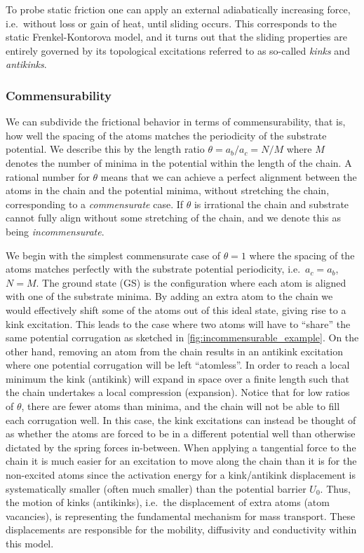 To probe static friction one can apply an external adiabatically increasing force, i.e.\ without loss or gain of heat, until sliding occurs. This corresponds to the static Frenkel-Kontorova model, and it turns out that the sliding properties are entirely governed by its topological excitations referred to as so-called \textit{kinks} and \textit{antikinks}.

\subsubsection{Commensurability} We can subdivide the frictional behavior in terms of commensurability, that is, how well the spacing of the atoms matches the periodicity of the substrate potential. We describe this by the length ratio $\theta = a_b / a_c = N / M$ where $M$ denotes the number of minima in the potential within the length of the chain. A rational number for $\theta$ means that we can achieve a perfect alignment between the atoms in the chain and the potential minima, without stretching the chain, corresponding to a \textit{commensurate} case. If $\theta$ is irrational the chain and substrate cannot fully align without some stretching of the chain, and we denote this as being \textit{incommensurate}.

We begin with the simplest commensurate case of $\theta = 1$ where the spacing
of the atoms matches perfectly with the substrate potential periodicity, i.e.\
$a_c = a_b$, $N = M$. The ground state (\acrshort{GS}) is the configuration
where each atom is aligned with one of the substrate minima. By adding an extra
atom to the chain we would effectively shift some of the atoms out of this
ideal state, giving rise to a kink excitation. This leads to the case where two
atoms will have to ``share'' the same potential corrugation as sketched in
\cref{fig:incommensurable_example}. On the other hand, removing an atom from
the chain results in an antikink excitation where one potential corrugation will
be left ``atomless''. In order to reach a local minimum the kink (antikink) will
expand in space over a finite length such that the chain undertakes a local
compression (expansion). Notice that for low ratios of $\theta$, there are fewer atoms than minima, and the chain will not be able to fill each corrugation well. In this case, the kink excitations can instead be thought of as whether the atoms are forced to be in a different potential well than otherwise dictated by the spring forces in-between. When applying a tangential force to the chain it is much
easier for an excitation to move along the chain than it is for the non-excited
atoms since the activation energy for a kink/antikink
displacement is systematically smaller (often much smaller) than the potential
barrier $U_0$. Thus, the motion of kinks (antikinks), i.e.\ the displacement of
extra atoms (atom vacancies), is representing the fundamental mechanism for
mass transport. These displacements are responsible for the mobility,
diffusivity and conductivity within this model. 

